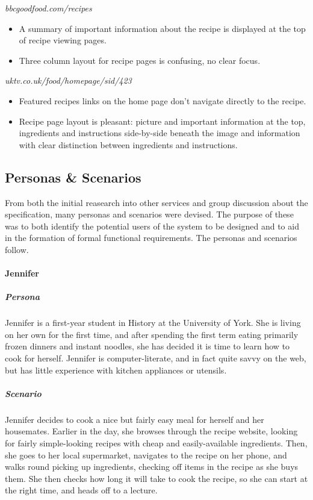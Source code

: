 \emph{bbcgoodfood.com/recipes}
\begin{itemize}
\item A summary of important information about the recipe is displayed at the top of recipe viewing pages.
\item Three column layout for recipe pages is confusing, no clear focus.
\end{itemize}

\emph{uktv.co.uk/food/homepage/sid/423}
\begin{itemize}
\item Featured recipes links on the home page don't navigate directly to the recipe.
\item Recipe page layout is pleasant: picture and important information at the top, ingredients and instructions side-by-side beneath the image and information with clear distinction between ingredients and instructions.
\end{itemize}

\subsection{Personas \& Scenarios}
From both the initial reasearch into other services and group discussion about the specification, many personas and scenarios were devised. The purpose of these was to both identify the potential users of the system to be designed and to aid in the formation of formal functional requirements. The personas and scenarios follow.

\paragraph{Jennifer}
\subparagraph{Persona}
Jennifer is a first-year student in History at the University of York. She is 
living on her own for the first time, and after spending the first term eating
primarily frozen dinners and instant noodles, she has decided it is time to 
learn how to cook for herself. Jennifer is computer-literate, and in fact quite
savvy on the web, but has little experience with kitchen appliances or utensils.
\subparagraph{Scenario}
Jennifer decides to cook a nice but fairly easy meal for herself and her 
housemates. Earlier in the day, she browses through the recipe website, looking
for fairly simple-looking recipes with cheap and easily-available ingredients.
Then, she goes to her local supermarket, navigates to the recipe on her phone,
and walks round picking up ingredients, checking off items in the recipe as she
buys them. She then checks how long it will take to cook the recipe, so she can
start at the right time, and heads off to a lecture.

